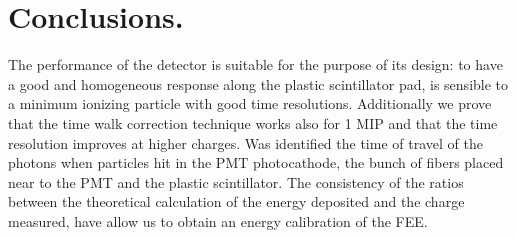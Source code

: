 \pagebreak

\section{Conclusions.}

The performance of the detector is suitable for the purpose of its design: to have a good and homogeneous response 
along the plastic scintillator pad, is sensible to a minimum ionizing particle with good time resolutions. 
Additionally we prove that the time walk correction technique works also for 1 MIP and that the time resolution improves at higher charges.
Was identified the time of travel of the photons when particles hit in the PMT photocathode, the bunch of fibers 
placed near to the PMT and the plastic scintillator. 
The consistency of the ratios between the theoretical calculation of the energy deposited and the charge measured, have allow us to obtain an energy calibration of the FEE.
